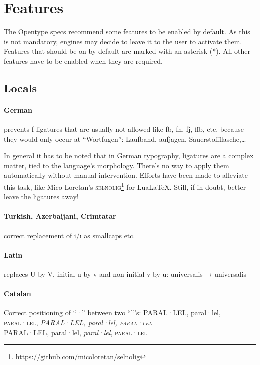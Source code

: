 \documentclass[pagesize,DIV14]{scrartcl}
\begin{document}
\clearpage

\section{Features}

The Opentype specs recommend some features to be enabled by default. As this is not mandatory, engines may decide to leave it to the user to activate them. Features that should be on by default are marked with an asterisk (*). All other features have to be enabled when they are required.

\subsection{Locals}
\paragraph*{German} prevents f-ligatures that are usually not allowed like fb, fh, fj, ffb, etc. because they would only occur at \enquote{Wortfugen}: {Laufband, aufjagen, Sauerstoffflasche,…}\par
In general it has to be noted that in German typography, ligatures are a complex matter, tied to the language’s morphology. There’s no way to apply them automatically without manual intervention. Efforts have been made to alleviate this task, like Mico Loretan’s \textsc{selnolig}\footnote{https://github.com/micoloretan/selnolig} for LuaLaTeX. Still, if in doubt, better leave the ligatures away!
\paragraph*{Turkish, Azerbaijani, Crimtatar} correct replacement of i/ı as smallcaps etc.
\paragraph*{Latin} replaces U by V, initial u by v and non-initial v by u: universalis → { universalis}
\paragraph*{Catalan} Correct positioning of “·” between two “l”s: {PARAL·LEL, paral·lel, \textsc{paral·lel}, \textit{PARAL·LEL, paral·lel, \textsc{paral·lel}}\\{\scriptsize PARAL·LEL, paral·lel, \textit{paral·lel}, \textsc{paral·lel}}}
\end{document}
